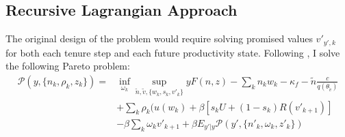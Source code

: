 \subsection{Recursive Lagrangian Approach} \label{dual}
The original design of the problem would require solving promised values $v'_{y',k}$ for both each tenure step and each future productivity state. Following \textcite{balke2022}, I solve the following Pareto problem:
\begin{equation*}
\begin{split}
\mathcal{P}(y,\{n_k,\rho_k,z_k\}) = &\inf_{\omega_k} \sup_{\tilde{n},\tilde{v},\{w_k,s_k,v'_k\}}  yF(n,z) - \sum_k n_kw_k - \kappa_f - \tilde{n}\frac{c}{q(\theta_{\tilde{v}})}   \\
& + \sum_k\rho_k(u(w_k)+\beta[s_kU+(1-s_k)R(v'_{k+1})] \\
& -\beta\sum_k \omega_k v'_{k+1}+\beta E_{y'|y}\mathcal{P}(y',\{n'_k,\omega_k,z'_k\})    
\end{split}
\end{equation*}

